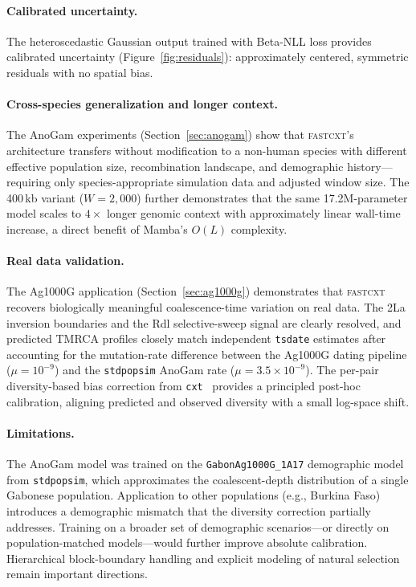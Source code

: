 \documentclass{article}
\begin{document}
\paragraph{Calibrated uncertainty.}
The heteroscedastic Gaussian output trained with Beta-NLL loss provides calibrated uncertainty
(Figure~\ref{fig:residuals}): approximately centered, symmetric residuals with no spatial bias.

\paragraph{Cross-species generalization and longer context.}
The AnoGam experiments (Section~\ref{sec:anogam}) show that \textsc{fastcxt}'s architecture transfers
without modification to a non-human species with different effective population size,
recombination landscape, and demographic history---requiring only species-appropriate
simulation data and adjusted window size. The 400\,kb variant ($W = 2{,}000$) further
demonstrates that the same 17.2M-parameter model scales to $4\times$ longer genomic
context with approximately linear wall-time increase, a direct benefit of Mamba's
$O(L)$ complexity.

\paragraph{Real data validation.}
The Ag1000G application (Section~\ref{sec:ag1000g}) demonstrates that \textsc{fastcxt}
recovers biologically meaningful coalescence-time variation on real data. The 2La inversion
boundaries and the Rdl selective-sweep signal are clearly resolved, and predicted
TMRCA profiles closely match independent \texttt{tsdate} estimates after accounting for
the mutation-rate difference between the Ag1000G dating pipeline ($\mu = 10^{-9}$) and
the \texttt{stdpopsim} AnoGam rate ($\mu = 3.5 \times 10^{-9}$). The per-pair
diversity-based bias correction from \texttt{cxt}~\citep{korfmann2025cxt} provides a
principled post-hoc calibration, aligning predicted and observed diversity with a small
log-space shift.

\paragraph{Limitations.}
The AnoGam model was trained on the \texttt{GabonAg1000G\_1A17} demographic model from
\texttt{stdpopsim}, which approximates the coalescent-depth distribution of a single
Gabonese population. Application to other populations (e.g., Burkina Faso) introduces
a demographic mismatch that the diversity correction partially addresses. Training on
a broader set of demographic scenarios---or directly on population-matched
models---would further improve absolute calibration. Hierarchical block-boundary handling
and explicit modeling of natural selection remain important directions.
\end{document}
